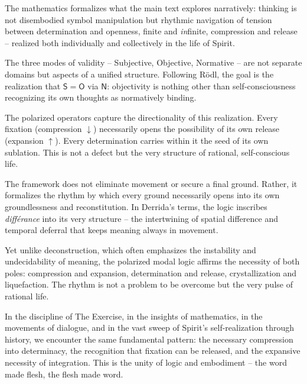 \documentclass[12pt]{book}
\begin{document}
The mathematics formalizes what the main text explores narratively: thinking is not disembodied symbol manipulation but rhythmic navigation of tension between determination and openness, finite and \textit{in}finite, compression and release -- realized both individually and collectively in the life of Spirit.

The three modes of validity -- Subjective, Objective, Normative -- are not separate domains but aspects of a unified structure. Following Rödl, the goal is the realization that $\mathsf{S} = \mathsf{O}$ via $\mathsf{N}$: objectivity is nothing other than self-consciousness recognizing its own thoughts as normatively binding.

The polarized operators capture the directionality of this realization. Every fixation (compression $\downarrow$) necessarily opens the possibility of its own release (expansion $\uparrow$). Every determination carries within it the seed of its own sublation. This is not a defect but the very structure of rational, self-conscious life.

The framework does not eliminate movement or secure a final ground. Rather, it formalizes the rhythm by which every ground necessarily opens into its own groundlessness and reconstitution. In Derrida's terms, the logic inscribes \textit{différance} into its very structure -- the intertwining of spatial difference and temporal deferral that keeps meaning always in movement.

Yet unlike deconstruction, which often emphasizes the instability and undecidability of meaning, the polarized modal logic affirms the necessity of both poles: compression and expansion, determination and release, crystallization and liquefaction. The rhythm is not a problem to be overcome but the very pulse of rational life.

In the discipline of The Exercise, in the insights of mathematics, in the movements of dialogue, and in the vast sweep of Spirit's self-realization through history, we encounter the same fundamental pattern: the necessary compression into determinacy, the recognition that fixation can be released, and the expansive necessity of integration. This is the unity of logic and embodiment -- the word made flesh, the flesh made word.

\printbibliography
\end{document}
